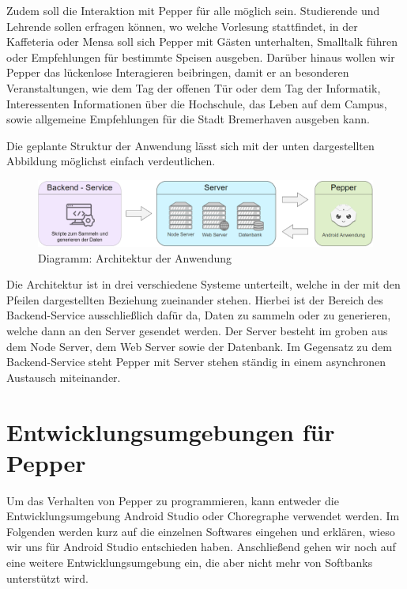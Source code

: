 Zudem soll die Interaktion mit Pepper für alle möglich sein. Studierende und Lehrende sollen erfragen können,
wo welche Vorlesung stattfindet, in der Kaffeteria oder Mensa soll sich Pepper mit Gästen unterhalten, Smalltalk führen oder
Empfehlungen für bestimmte Speisen ausgeben. Darüber hinaus wollen wir Pepper das lückenlose Interagieren beibringen, damit er an
besonderen Veranstaltungen, wie dem Tag der offenen Tür oder dem Tag der Informatik, Interessenten Informationen über die Hochschule,
das Leben auf dem Campus, sowie allgemeine Empfehlungen für die Stadt Bremerhaven ausgeben kann.

Die geplante Struktur der Anwendung lässt sich mit der unten dargestellten Abbildung möglichst einfach verdeutlichen. 

\begin{figure}[H]
    \includegraphics[width=\textwidth]{Figures/anwendungarchitektur.png}
    \caption{Diagramm: Architektur der Anwendung}
    \label{fig:integration}
    \centering
\end{figure}

Die Architektur ist in drei verschiedene Systeme unterteilt, welche in der mit den Pfeilen dargestellten Beziehung zueinander stehen. Hierbei ist der Bereich des Backend-Service ausschließlich dafür da, Daten zu sammeln oder zu generieren, welche dann an den Server gesendet werden. Der Server besteht im groben aus dem Node Server, dem Web Server sowie der Datenbank. Im Gegensatz zu dem Backend-Service steht Pepper mit Server stehen ständig in einem asynchronen Austausch miteinander.

\section{Entwicklungsumgebungen für Pepper}

Um das Verhalten von Pepper zu programmieren, kann entweder die Entwicklungsumgebung Android Studio oder Choregraphe verwendet werden. 
Im Folgenden werden kurz auf die einzelnen Softwares eingehen und erklären, wieso wir uns für Android Studio entschieden haben. 
Anschließend gehen wir noch auf eine weitere Entwicklungsumgebung ein, die aber nicht mehr von Softbanks unterstützt wird.

